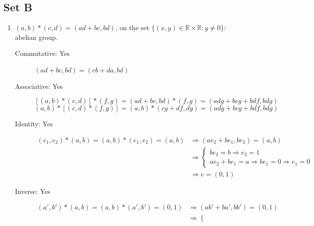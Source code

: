 \documentclass{article}
\begin{document}
\subsection{Set B}
\begin{enumerate}
    \item $(a, b) * (c , d) = (ad + bc, bd)$, on the set $\{(x, y) \in \mathbb{R} \times \mathbb{R}: y \ne 0\}$: abelian group.
        \begin{description}
            \item [Commutative: Yes] $(ad + bc, bd) = (cb + da, bd)$
            \item [Associative: Yes]
                $$[(a, b) * (c, d)] * (f, g) = (ad + bc, bd) * (f, g) = (adg + bcg + bdf, bdg)$$
                $$(a, b) * [(c, d) * (f, g)] = (a, b) * (cg + df, dg) = (adg + bcg + bdf, bdg)$$
            \item [Identity: Yes]
                \begin{equation*}
                    \begin{split}
                        (e_1, e_2) * (a, b) = (a, b) * (e_1, e_2) = (a, b) & \Rightarrow (ae_2 + be_1, be_2) = (a, b) \\
                                                                           & \Rightarrow  \begin{cases}
                                                                                                be_2 = b \Rightarrow e_2 = 1 \\
                                                                                                ae_2 + be_1 = a \Rightarrow be_1 = 0 \Rightarrow e_1 = 0
                                                                                          \end{cases} \\
                                                                           & \Rightarrow e = (0, 1)
                    \end{split}
                \end{equation*}
            \item [Inverse: Yes]
                \begin{equation*}
                    \begin{split}
                        (a', b') * (a, b) = (a, b) * (a', b') = (0, 1) & \Rightarrow (ab' + ba', bb') = (0, 1) \\
                                                                       & \Rightarrow \begin{cases}

\end{cases}
\end{split}
\end{equation*}
\end{description}
\end{enumerate}
\end{document}
